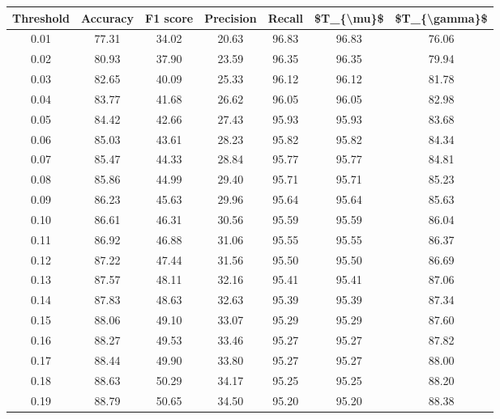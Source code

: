 \begin{tabular}{|c|c|c|c|c|c|c|}
\hline
 Threshold &  Accuracy &  F1 score &  Precision &  Recall &  \$T\_\{\textbackslash mu\}\$ &  \$T\_\{\textbackslash gamma\}\$ \\
\hline
      0.01 &     77.31 &     34.02 &      20.63 &   96.83 &      96.83 &         76.06 \\
      0.02 &     80.93 &     37.90 &      23.59 &   96.35 &      96.35 &         79.94 \\
      0.03 &     82.65 &     40.09 &      25.33 &   96.12 &      96.12 &         81.78 \\
      0.04 &     83.77 &     41.68 &      26.62 &   96.05 &      96.05 &         82.98 \\
      0.05 &     84.42 &     42.66 &      27.43 &   95.93 &      95.93 &         83.68 \\
      0.06 &     85.03 &     43.61 &      28.23 &   95.82 &      95.82 &         84.34 \\
      0.07 &     85.47 &     44.33 &      28.84 &   95.77 &      95.77 &         84.81 \\
      0.08 &     85.86 &     44.99 &      29.40 &   95.71 &      95.71 &         85.23 \\
      0.09 &     86.23 &     45.63 &      29.96 &   95.64 &      95.64 &         85.63 \\
      0.10 &     86.61 &     46.31 &      30.56 &   95.59 &      95.59 &         86.04 \\
      0.11 &     86.92 &     46.88 &      31.06 &   95.55 &      95.55 &         86.37 \\
      0.12 &     87.22 &     47.44 &      31.56 &   95.50 &      95.50 &         86.69 \\
      0.13 &     87.57 &     48.11 &      32.16 &   95.41 &      95.41 &         87.06 \\
      0.14 &     87.83 &     48.63 &      32.63 &   95.39 &      95.39 &         87.34 \\
      0.15 &     88.06 &     49.10 &      33.07 &   95.29 &      95.29 &         87.60 \\
      0.16 &     88.27 &     49.53 &      33.46 &   95.27 &      95.27 &         87.82 \\
      0.17 &     88.44 &     49.90 &      33.80 &   95.27 &      95.27 &         88.00 \\
      0.18 &     88.63 &     50.29 &      34.17 &   95.25 &      95.25 &         88.20 \\
      0.19 &     88.79 &     50.65 &      34.50 &   95.20 &      95.20 &         88.38 \\

\end{tabular}
